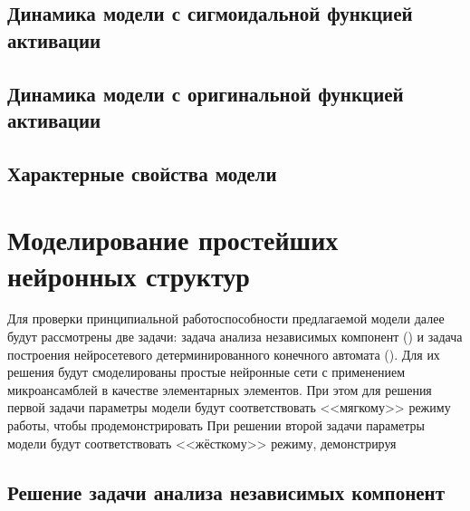 \subsection{Динамика модели с сигмоидальной функцией активации}

\subsection{Динамика модели с оригинальной функцией активации}

\subsection{Характерные свойства модели}


\section{Моделирование простейших нейронных структур} \label{section:neuron_modeling}

Для проверки принципиальной работоспособности предлагаемой модели далее будут рассмотрены две задачи: задача анализа независимых компонент () и задача построения нейросетевого детерминированного конечного автомата (). Для их решения будут смоделированы простые нейронные сети с применением микроансамблей в качестве элементарных элементов. При этом для решения первой задачи параметры модели будут соответствовать <<мягкому>> режиму работы, чтобы продемонстрировать  При решении второй задачи параметры модели будут соответствовать <<жёсткому>> режиму, демонстрируя


\subsection{Решение задачи анализа независимых компонент}

